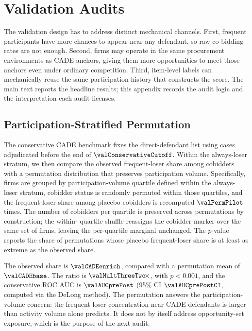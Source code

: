 \section{Validation Audits}
\label{app:validation_audits_submission}

The validation design has to address distinct mechanical
channels. First, frequent participants have more chances to
appear near any defendant, so raw co-bidding rates are not
enough. Second, firms may operate in the same procurement
environments as CADE anchors, giving them more opportunities to
meet those anchors even under ordinary competition. Third,
item-level labels can mechanically reuse the same participation
history that constructs the score. The main text reports the
headline results; this appendix records the audit logic and the
interpretation each audit licenses.

\subsection{Participation-Stratified Permutation}
\label{app:permutation_submission}

The conservative CADE benchmark fixes the direct-defendant list
using cases adjudicated before the end of
$\valConservativeCutoff$. Within the always-loser stratum, we
then compare the observed frequent-loser share among cobidders
with a permutation distribution that preserves participation
volume. Specifically, firms are grouped by participation-volume
quartile defined within the always-loser stratum, cobidder
status is randomly permuted within those quartiles, and the
frequent-loser share among placebo cobidders is recomputed
$\valPermPilot$ times. The number of cobidders per quartile is
preserved across permutations by construction; the within-
quartile shuffle reassigns the cobidder marker over the same
set of firms, leaving the per-quartile marginal unchanged. The
$p$-value reports the share of permutations whose placebo
frequent-loser share is at least as extreme as the observed
share.

The observed share is $\valCADEenrich$, compared with a
permutation mean of $\valCADEbase$. The ratio is
$\valMultThreeTwo\!\times$, with $p<0.001$, and the conservative
ROC AUC is $\valAUCprePost$ (95\% CI $\valAUCprePostCI$,
computed via the DeLong method). The permutation answers the
participation-volume concern: the frequent-loser concentration
near CADE defendants is larger than activity volume alone
predicts. It does not by itself address opportunity-set
exposure, which is the purpose of the next audit.

